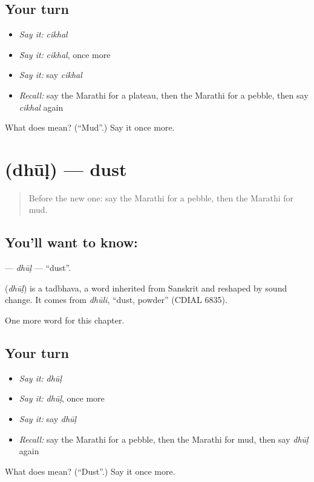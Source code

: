 \subsection*{Your turn}
\begin{itemize}
\raggedright
  \item \emph{Say it:} \emph{cikhal}
  \item \emph{Say it:} \emph{cikhal}, once more
  \item \emph{Say it:} say \emph{cikhal}
  \item \emph{Recall:} say the Marathi for a plateau, then the Marathi for a pebble, then say \emph{cikhal} again
\end{itemize}

\begin{tcolorbox}[breakable,colback=teal!4,colframe=teal!35!black,title={Before you move on}]
What does  mean? (\textquotedblleft{}Mud\textquotedblright{}.) Say it once more.
\end{tcolorbox}
\section[\texorpdfstring{\mr{धूळ} (dhūḷ)}{धूळ (dhūḷ)}]{ (dhūḷ) — dust}

\label{lesson:MR-C267-dhul}



\begin{quote}
Before the new one: say the Marathi for a pebble, then the Marathi for mud.
\end{quote}

\subsection*{You'll want to know: }
\textbf{} — \emph{dhūḷ} — \textquotedblleft{}dust\textquotedblright{}.

\begin{cousinweb}
\textbf{} (\emph{dhūḷ}) is a tadbhava, a word inherited from Sanskrit and reshaped by sound change. It comes from \emph{dhūli}, \textquotedblleft{}dust, powder\textquotedblright{} (CDIAL 6835).
\end{cousinweb}

\begin{grammarlens}[title={What you've built}]
One more word for this chapter.
\end{grammarlens}

\subsection*{Your turn}
\begin{itemize}
\raggedright
  \item \emph{Say it:} \emph{dhūḷ}
  \item \emph{Say it:} \emph{dhūḷ}, once more
  \item \emph{Say it:} say \emph{dhūḷ}
  \item \emph{Recall:} say the Marathi for a pebble, then the Marathi for mud, then say \emph{dhūḷ} again
\end{itemize}

\begin{tcolorbox}[breakable,colback=teal!4,colframe=teal!35!black,title={Before you move on}]
What does  mean? (\textquotedblleft{}Dust\textquotedblright{}.) Say it once more.
\end{tcolorbox}
